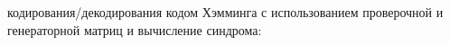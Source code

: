 \documentclass[a4paper,12pt]{article}
\begin{document}
\begin{enumerate}
{ кодирования/декодирования кодом Хэмминга с использованием проверочной и генераторной матриц и вычисление синдрома:
\\}


\end{enumerate}
\end{document}
